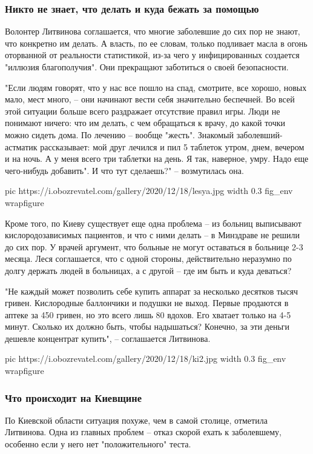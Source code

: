 \subsubsection{Никто не знает, что делать и куда бежать за помощью}

Волонтер Литвинова соглашается, что многие заболевшие до сих пор не знают, что
конкретно им делать. А власть, по ее словам, только подливает масла в огонь
оторванной от реальности статистикой, из-за чего у инфицированных создается
"иллюзия благополучия". Они прекращают заботиться о своей безопасности.

"Если людям говорят, что у нас все пошло на спад, смотрите, все хорошо, новых
мало, мест много, – они начинают вести себя значительно беспечней. Во всей этой
ситуации больше всего раздражает отсутствие правил игры. Люди не понимают
ничего: что им делать, с чем обращаться к врачу, до какой точки можно сидеть
дома. По лечению – вообще "жесть". Знакомый заболевший-астматик рассказывает:
мой друг лечился и пил 5 таблеток утром, днем, вечером и на ночь. А у меня
всего три таблетки на день. Я так, наверное, умру. Надо еще чего-нибудь
добавить". И что тут сделаешь?" – возмутилась она.

\ifcmt
pic https://i.obozrevatel.com/gallery/2020/12/18/lesya.jpg
width 0.3
fig_env wrapfigure
\fi

Кроме того, по Киеву существует еще одна проблема – из больниц выписывают
кислородозависимых пациентов, и что с ними делать – в Минздраве не решили до
сих пор. У врачей аргумент, что больные не могут оставаться в больнице 2-3
месяца. Леся соглашается, что с одной стороны, действительно неразумно по долгу
держать людей в больницах, а с другой – где им быть и куда деваться?

"Не каждый может позволить себе купить аппарат за несколько десятков тысяч
гривен. Кислородные баллончики и подушки не выход. Первые продаются в аптеке за
450 гривен, но это всего лишь 80 вдохов. Его хватает только на 4-5 минут.
Сколько их должно быть, чтобы надышаться? Конечно, за эти деньги дешевле
концентрат купить", – соглашается Литвинова.

\ifcmt
  pic https://i.obozrevatel.com/gallery/2020/12/18/ki2.jpg
  width 0.3
  fig_env wrapfigure
\fi

\subsubsection{Что происходит на Киевщине}

По Киевской области ситуация похуже, чем в самой столице, отметила Литвинова.
Одна из главных проблем – отказ скорой ехать к заболевшему, особенно если у
него нет "положительного" теста.


